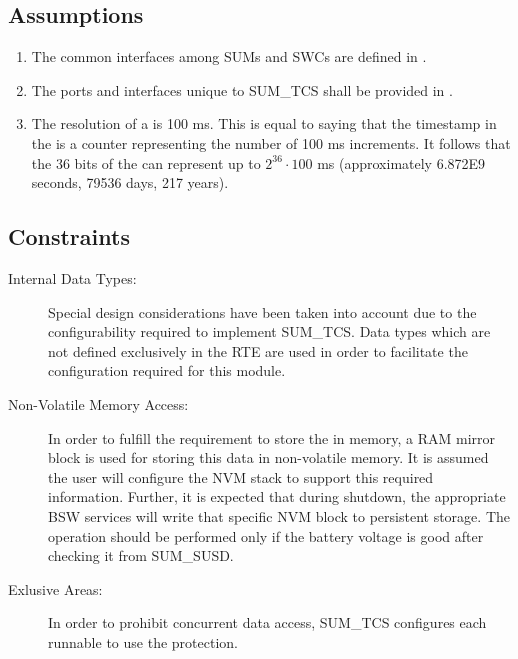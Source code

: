 \subsection{Assumptions}
\label{sec:assumptions}

\begin{enumerate}
\item The common interfaces among SUMs and SWCs are defined in .
\item The ports and interfaces unique to SUM_TCS shall be provided in .
\item The resolution of a  is 100 ms.
This is equal to saying that the timestamp in the  is a counter representing the number of 100 ms increments.
It follows that the 36 bits of the  can represent up to $2^{36} \cdot 100$ ms (approximately 6.872E9 seconds, 79536 days, 217 years).
\end{enumerate}

\subsection{Constraints}
\label{sec:constraints}

\begin{description}
\item[Internal Data Types:] Special design considerations have been taken into account due to the configurability required to implement SUM_TCS.
Data types which are not defined exclusively in the RTE are used in order to facilitate the configuration required for this module.
\item[Non-Volatile Memory Access:] In order to fulfill the requirement to store the  in memory, a RAM mirror block is used for storing this data in non-volatile memory.
It is assumed the user will configure the NVM stack to support this required information.
Further, it is expected that during shutdown, the appropriate BSW services will write that specific NVM block to persistent storage. The operation should be performed only if the battery voltage is good after checking it from SUM_SUSD.
\item[Exlusive Areas:] In order to prohibit concurrent data access, SUM_TCS configures each runnable to use the  protection.
\end{description}